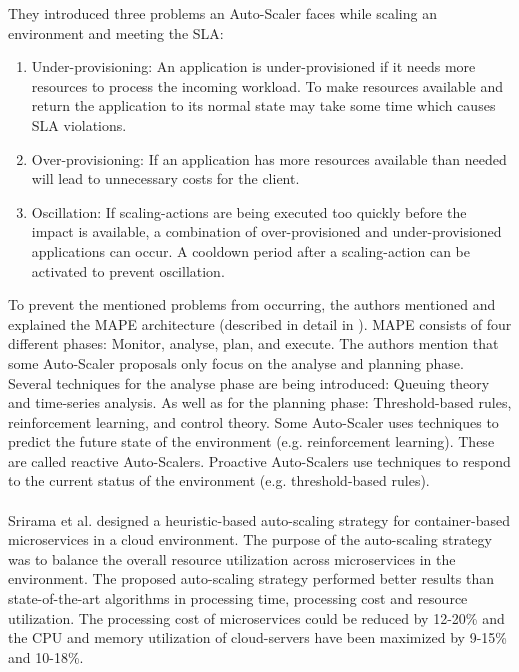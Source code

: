 They introduced three problems an Auto-Scaler faces while scaling an environment and meeting the SLA:
\begin{enumerate}
\item Under-provisioning:
An application is under-provisioned if it needs more resources to process the incoming workload.
To make resources available and return the application to its normal state may take some time which causes SLA violations.
\item Over-provisioning:
If an application has more resources available than needed will lead to unnecessary costs for the client.
\item Oscillation:
If scaling-actions are being executed too quickly before the impact is available, a combination of over-provisioned and under-provisioned applications can occur.
A cooldown period after a scaling-action can be activated to prevent oscillation.
\end{enumerate}
To prevent the mentioned problems from occurring, the authors mentioned and explained the MAPE architecture (described in detail in ).
MAPE consists of four different phases: Monitor, analyse, plan, and execute.
The authors mention that some Auto-Scaler proposals only focus on the analyse and planning phase. 
Several techniques for the analyse phase are being introduced: Queuing theory and time-series analysis.
As well as for the planning phase: Threshold-based rules, reinforcement learning, and control theory.
Some Auto-Scaler uses techniques to predict the future state of the environment (e.g. reinforcement learning). These are called reactive Auto-Scalers.
Proactive Auto-Scalers use techniques to respond to the current status of the environment (e.g. threshold-based rules).


\paragraph{}
Srirama et al. \cite{Srirama2020AppDeplyCont} designed a heuristic-based auto-scaling strategy for container-based microservices in a cloud environment. The purpose of the auto-scaling strategy was to balance the overall resource utilization across microservices in the environment.
The proposed auto-scaling strategy performed better results than state-of-the-art algorithms in processing time, processing cost and resource utilization. The processing cost of microservices could be reduced by 12-20\% and the CPU and memory utilization of cloud-servers have been maximized by 9-15\% and 10-18\%.


